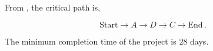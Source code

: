 \begin{subquestions}

\subquestion

\begin{subsubquestions}
	

\subsubquestion

From , the critical path is,

\begin{equation}
	\text{Start} \rightarrow A \rightarrow D \rightarrow C \rightarrow \text{End}\,.
\end{equation}


\subsubquestion

The minimum completion time of the project is $28$ days.
\end{subsubquestions}

\end{subquestions}

